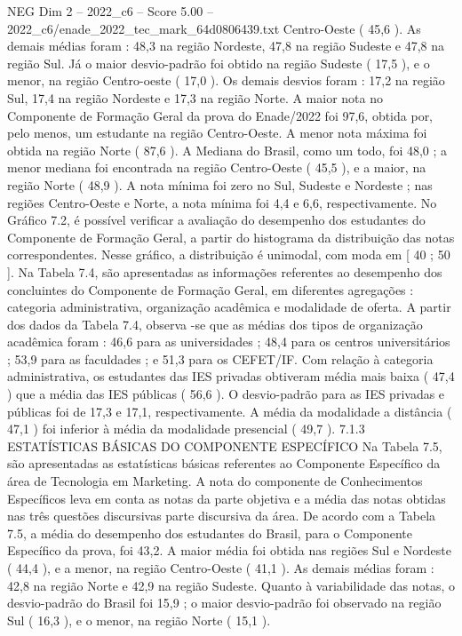 \begin{textsample}{NEG Dim 2 – 2022\_c6 – Score 5.00 – 2022\_c6/enade\_2022\_tec\_mark\_64d0806439.txt}
Centro-Oeste ( 45,6 ).
As demais médias foram : 48,3 na região Nordeste, 47,8 na região Sudeste e 47,8 na região Sul.
Já o maior desvio-padrão foi obtido na região Sudeste ( 17,5 ), e o menor, na região Centro-oeste ( 17,0 ).
Os demais desvios foram : 17,2 na região Sul, 17,4 na região Nordeste e 17,3 na região Norte.
A maior nota no Componente de Formação Geral da prova do Enade/2022 foi 97,6, obtida por, pelo menos, um estudante na região Centro-Oeste.
A menor nota máxima foi obtida na região Norte ( 87,6 ).
A Mediana do Brasil, como um todo, foi 48,0 ; a menor mediana foi encontrada na região Centro-Oeste ( 45,5 ), e a maior, na região Norte ( 48,9 ).
A nota mínima foi zero no Sul, Sudeste e Nordeste ; nas regiões Centro-Oeste e Norte, a nota mínima foi 4,4 e 6,6, respectivamente.
No Gráfico 7.2, é possível verificar a avaliação do desempenho dos estudantes do Componente de Formação Geral, a partir do histograma da distribuição das notas correspondentes.
Nesse gráfico, a distribuição é unimodal, com moda em [ 40 ; 50 ].
Na Tabela 7.4, são apresentadas as informações referentes ao desempenho dos concluintes do Componente de Formação Geral, em diferentes agregações : categoria administrativa, organização acadêmica e modalidade de oferta.
A partir dos dados da Tabela 7.4, observa -se que as médias dos tipos de organização acadêmica foram : 46,6 para as universidades ; 48,4 para os centros universitários ; 53,9 para as faculdades ; e 51,3 para os CEFET/IF.
Com relação à categoria administrativa, os estudantes das IES privadas obtiveram média mais baixa ( 47,4 ) que a média das IES públicas ( 56,6 ).
O desvio-padrão para as IES privadas e públicas foi de 17,3 e 17,1, respectivamente.
A média da modalidade a distância ( 47,1 ) foi inferior à média da modalidade presencial ( 49,7 ). 7.1.3 ESTATÍSTICAS BÁSICAS DO COMPONENTE ESPECÍFICO Na Tabela 7.5, são apresentadas as estatísticas básicas referentes ao Componente Específico da área de Tecnologia em Marketing.
A nota do componente de Conhecimentos Específicos leva em conta as notas da parte objetiva e a média das notas obtidas nas três questões discursivas parte discursiva da área.
De acordo com a Tabela 7.5, a média do desempenho dos estudantes do Brasil, para o Componente Específico da prova, foi 43,2.
A maior média foi obtida nas regiões Sul e Nordeste ( 44,4 ), e a menor, na região Centro-Oeste ( 41,1 ).
As demais médias foram : 42,8 na região Norte e 42,9 na região Sudeste.
Quanto à variabilidade das notas, o desvio-padrão do Brasil foi 15,9 ; o maior desvio-padrão foi observado na região Sul ( 16,3 ), e o menor, na região Norte ( 15,1 ).

\end{textsample}
